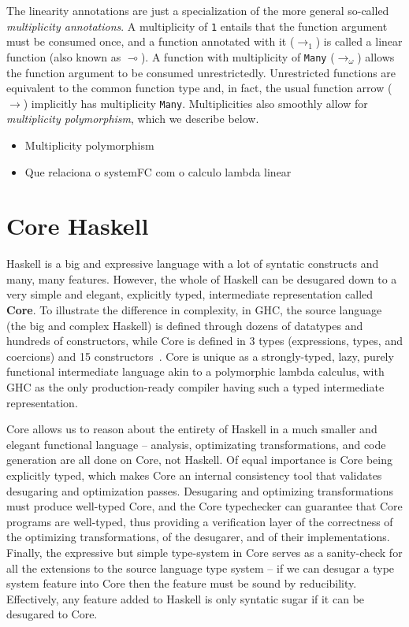 \documentclass[]{lwnovathesis}
\newcommand{\lolli}{\multimap}
\begin{document}
The linearity annotations are just a specialization of the more general so-called
\emph{multiplicity annotations}. A multiplicity of \texttt{1} entails that the
function argument must be consumed once, and a function annotated with it
($\to_1$) is called a linear function (also known as $\lolli$). A function with
multiplicity of \texttt{Many} ($\to_\omega$) allows the function argument to
be consumed unrestrictedly. Unrestricted functions are equivalent to the common
function type and, in fact, the usual function arrow ($\to$) implicitly has
multiplicity \texttt{Many}.  Multiplicities also smoothly allow for
\emph{multiplicity polymorphism}, which we describe below.


\begin{itemize}
    \item Multiplicity polymorphism
    \item Que relaciona o systemFC com o calculo lambda linear
\end{itemize}

\section{Core Haskell\label{core-section}}

Haskell is a big and expressive language with a lot of syntatic constructs and
many, many features. However, the whole of Haskell can be desugared down to a
very simple and elegant, explicitly typed, intermediate representation called
\textbf{Core}. To illustrate the difference in complexity, in GHC, the source
language (the big and complex Haskell) is defined through dozens of datatypes
and hundreds of constructors, while Core is defined in 3 types (expressions,
types, and coercions) and 15 constructors~\cite{}.
%
Core is unique as a strongly-typed, lazy, purely functional intermediate
language akin to a polymorphic lambda calculus, with GHC as the only
production-ready compiler having such a typed intermediate representation.

Core allows us to reason about the entirety of Haskell in a much smaller and
elegant functional language -- analysis, optimizating transformations, and code
generation are all done on Core, not Haskell.
%
Of equal importance is Core being explicitly typed, which makes Core an internal
consistency tool that validates desugaring and optimization passes. Desugaring
and optimizing transformations must produce well-typed Core, and the Core
typechecker can guarantee that Core programs are well-typed, thus providing a
verification layer of the correctness of the optimizing transformations, of the
desugarer, and of their implementations.
%
Finally, the expressive but simple type-system in Core serves as a sanity-check
for all the extensions to the source language type system -- if we can desugar a
type system feature into Core then the feature must be sound by reducibility.
Effectively, any feature added to Haskell is only syntatic sugar if it can be
desugared to Core.
\end{document}
